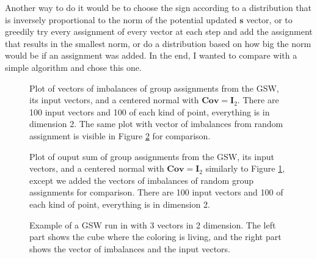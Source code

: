 \documentclass[12pt]{article}
\begin{document}
Another way to do it would be to choose the sign according to a distribution that is inversely proportional to the norm of the potential updated $\textbf{s}$ vector, or to greedily try every assignment of every vector at each step and add the assignment that results in the smallest norm, or do a distribution based on how big the norm would be if an assignment was added. In the end, I wanted to compare with a simple algorithm and chose this one.

\begin{figure}[h!]

\caption{Plot of vectors of imbalances of group assignments from the GSW, its input vectors, and a centered normal with $\textbf{Cov}=\textbf{I}_2$. There are 100 input vectors and 100 of each kind of point, everything is in dimension 2. The same plot with vector of imbalances from random assignment is visible in Figure \ref{4types_4} for comparison.}
\label{4types_3}
\end{figure}
\begin{figure}[h!]

\caption{Plot of ouput sum of group assignments from the GSW, its input vectors, and a centered normal with $\textbf{Cov}=\textbf{I}_2$ similarly to Figure \ref{4types_3}, except we added the vectors of imbalances of random group assignments for comparison. There are 100 input vectors and 100 of each kind of point, everything is in dimension 2.}
\label{4types_4}
\end{figure}

\begin{figure}
\centering
\newpage
{}
\caption{Example of a GSW run in with 3 vectors in 2 dimension. The left part shows the cube where the coloring is living, and the right part shows the vector of imbalances and the input vectors.}
\label{3d_example}

\end{figure}
\end{document}
